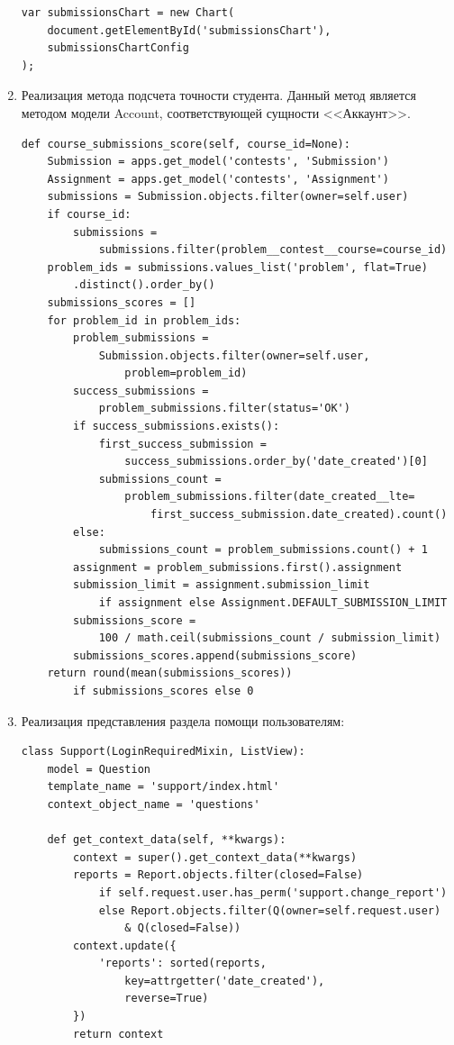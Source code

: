 \documentclass[12pt, a4paper, oneside]{article}
\begin{document}
\begin{enumerate}[wide, labelindent=0pt]
{\begin{verbatim}
var submissionsChart = new Chart(
    document.getElementById('submissionsChart'),
    submissionsChartConfig
);
        \end{verbatim}
    }
    \item {
        Реализация метода подсчета точности студента. Данный метод является методом модели Account, соответствующей сущности <<Аккаунт>>.\label{code:accuracy}
        \begin{verbatim}
def course_submissions_score(self, course_id=None):
    Submission = apps.get_model('contests', 'Submission')
    Assignment = apps.get_model('contests', 'Assignment')
    submissions = Submission.objects.filter(owner=self.user)
    if course_id:
        submissions = 
            submissions.filter(problem__contest__course=course_id)
    problem_ids = submissions.values_list('problem', flat=True)
        .distinct().order_by()
    submissions_scores = []
    for problem_id in problem_ids:
        problem_submissions = 
            Submission.objects.filter(owner=self.user, 
                problem=problem_id)
        success_submissions = 
            problem_submissions.filter(status='OK')
        if success_submissions.exists():
            first_success_submission = 
                success_submissions.order_by('date_created')[0]
            submissions_count = 
                problem_submissions.filter(date_created__lte=
                    first_success_submission.date_created).count()
        else:
            submissions_count = problem_submissions.count() + 1
        assignment = problem_submissions.first().assignment
        submission_limit = assignment.submission_limit 
            if assignment else Assignment.DEFAULT_SUBMISSION_LIMIT
        submissions_score = 
            100 / math.ceil(submissions_count / submission_limit)
        submissions_scores.append(submissions_score)
    return round(mean(submissions_scores)) 
        if submissions_scores else 0
        \end{verbatim}
    }
    \item {
        Реализация представления раздела помощи пользователям:\label{code:support}
        \begin{verbatim}
class Support(LoginRequiredMixin, ListView):
    model = Question
    template_name = 'support/index.html'
    context_object_name = 'questions'

    def get_context_data(self, **kwargs):
        context = super().get_context_data(**kwargs)
        reports = Report.objects.filter(closed=False) 
            if self.request.user.has_perm('support.change_report') 
            else Report.objects.filter(Q(owner=self.request.user) 
                & Q(closed=False))
        context.update({
            'reports': sorted(reports, 
                key=attrgetter('date_created'), 
                reverse=True)
        })
        return context


\end{verbatim}}
\end{enumerate}
\end{document}
